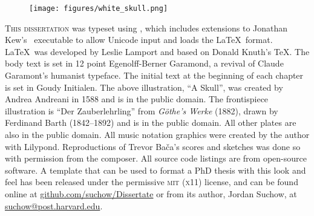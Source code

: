 \newpage

\begin{figure}
  \vspace{50pt}
  \centering
    \texttt{[image: figures/white\_skull.png]}
\end{figure}


\begin{center}
\parbox{0.51\textwidth}{\lettrine[lines=3,slope=-2pt,nindent=-4pt]{\textcolor{SchoolColor}{T}}{his dissertation} was typeset using , which includes extensions to Jonathan Kew's  \ executable to allow Unicode input and loads the \LaTeX \ format. \LaTeX \ was developed by Leslie Lamport and based on Donald Knuth’s \TeX. The body text is set in 12 point Egenolff-Berner Garamond, a revival of Claude Garamont's humanist typeface. The initial text at the beginning of each chapter is set in Goudy Initialen. The above illustration, ``A Skull'', was created by Andrea Andreani in 1588 and is in the public domain. The frontispiece illustration is ``Der Zauberlehrling'' from \textit{Göthe's Werke} (1882), drawn by Ferdinand Barth (1842–1892) and is in the public domain. All other plates are also in the public domain. All music notation graphics were created by the author with Lilypond. Reproductions of Trevor Ba\v{c}a's scores and sketches was done so with permission from the composer. All source code listings are from open-source software. A template that can be used to format a PhD thesis with this look and feel has been released under the permissive \textsc{mit} (\textsc{x}11) license, and can be found online at \href{https://github.com/suchow/Dissertate}{github.com/suchow/Dissertate} or from its author, Jordan Suchow, at \href{mailto:suchow@post.harvard.edu}{suchow@post.harvard.edu}.}
\end{center}